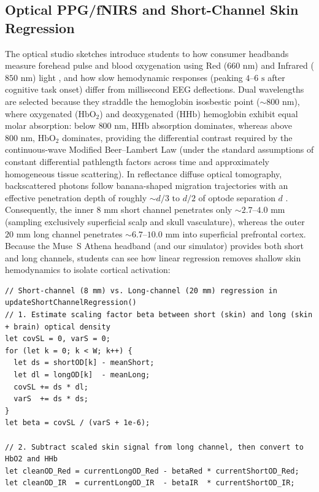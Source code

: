 \documentclass[11pt]{article}
\begin{document}
\subsection{Optical PPG/fNIRS and Short-Channel Skin Regression}
The optical studio sketches introduce students to how consumer headbands measure forehead pulse and blood oxygenation using Red ($660\text{ nm}$) and Infrared ($850\text{ nm}$) light \citep{delpy1988estimation,scholkmann2014review}, and how slow hemodynamic responses (peaking $4\text{--}6\text{ s}$ after cognitive task onset) differ from millisecond EEG deflections. Dual wavelengths are selected because they straddle the hemoglobin isosbestic point ($\sim 800\text{ nm}$), where oxygenated ($\text{HbO}_2$) and deoxygenated ($\text{HHb}$) hemoglobin exhibit equal molar absorption: below $800\text{ nm}$, $\text{HHb}$ absorption dominates, whereas above $800\text{ nm}$, $\text{HbO}_2$ dominates, providing the differential contrast required by the continuous-wave Modified Beer--Lambert Law (under the standard assumptions of constant differential pathlength factors across time and approximately homogeneous tissue scattering). In reflectance diffuse optical tomography, backscattered photons follow banana-shaped migration trajectories with an effective penetration depth of roughly $\sim d/3\text{ to }d/2$ of optode separation $d$ \citep{delpy1988estimation,saager2005direct}. Consequently, the inner $8\text{ mm}$ short channel penetrates only $\sim 2.7\text{--}4.0\text{ mm}$ (sampling exclusively superficial scalp and skull vasculature), whereas the outer $20\text{ mm}$ long channel penetrates $\sim 6.7\text{--}10.0\text{ mm}$ into superficial prefrontal cortex. Because the Muse~S Athena headband (and our simulator) provides both short and long channels, students can see how linear regression removes shallow skin hemodynamics to isolate cortical activation:

\noindent\begin{minipage}{\textwidth}
\begin{lstlisting}
// Short-channel (8 mm) vs. Long-channel (20 mm) regression in updateShortChannelRegression()
// 1. Estimate scaling factor beta between short (skin) and long (skin + brain) optical density
let covSL = 0, varS = 0;
for (let k = 0; k < W; k++) {
  let ds = shortOD[k] - meanShort;
  let dl = longOD[k]  - meanLong;
  covSL += ds * dl;
  varS  += ds * ds;
}
let beta = covSL / (varS + 1e-6);

// 2. Subtract scaled skin signal from long channel, then convert to HbO2 and HHb
let cleanOD_Red = currentLongOD_Red - betaRed * currentShortOD_Red;
let cleanOD_IR  = currentLongOD_IR  - betaIR  * currentShortOD_IR;
\end{lstlisting}
\end{minipage}
\vspace{4pt}
\end{document}
